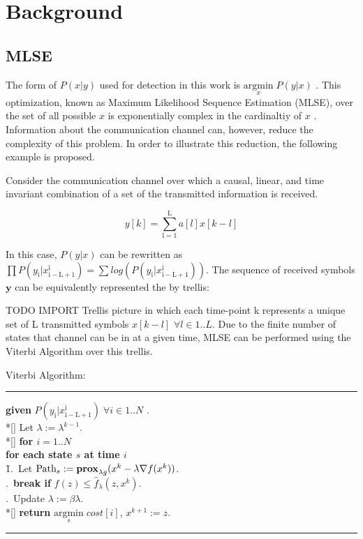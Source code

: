 \documentclass[12pt,a4paper]{report}
\begin{document}
\section{Background}

\subsection{MLSE}
The form of $P(x|y)$ used for detection in this work is
$\underset{x}{\text{argmin}} \; P(y|x) $ . This optimization, known as Maximum Likelihood Sequence Estimation (MLSE), over the set of all possible $x$ is exponentially complex in the cardinaltiy of $x$ . Information about the communication channel can, however, reduce the complexity of this problem. In order to illustrate this reduction, the following example is proposed.
\par
Consider the communication channel over which a causal, linear, and time invariant combination of a set of the transmitted information is received. 

\begin{equation}
y[k] = \sum_{\mathrm{l=1}}^{\mathrm{L}} a[l]x[k-l]
\end{equation}

In this case, $P(y|x)$ can be rewritten as
$\prod P(y_{\mathrm{i}}|x_{\mathrm{i-L+1}}^{\mathrm{i}}) = \sum
log(P(y_{\mathrm{i}}|x_{\mathrm{i-L+1}}^{\mathrm{i}}) )$.
The sequence of received symbols $\mathbf{y}$ can be equivalently represented the by trellis:

TODO IMPORT Trellis picture
in which each time-point k represents a unique set of L transmitted symbols 
$x[k-l]$ $ \forall l \in {1..L}$. Due to the finite number of states that channel can be in at a given time, MLSE can be performed using the Viterbi Algorithm over this trellis. 

Viterbi Algorithm:

    \noindent\rule[10pt]{\textwidth}{0.4pt}
    {\footnotesize
    \begin{tabbing}
        {\bf given} $P(y_{\mathrm{i}}|x_{\mathrm{i-L+1}}^{\mathrm{i}}) \; \forall i \in {1..N}$ . \\*[\smallskipamount]
        Let $\lambda := \lambda^{k-1}$. \\*[\smallskipamount]
        {\bf for $i = 1..N $} \\
         \qquad \= {\bf for each state $s$ at time $i$}\\
        \qquad \qquad \= 1.\ Let $\mathrm{Path}_{s} := \mathbf{prox}_{\lambda g}(x^{k} - \lambda \nabla f(x^{k}))$. \\
        .\ {\bf break if} $f(z) \leq \hat{f}_{\lambda}(z, x^{k})$. \\
        .\ Update $\lambda := \beta \lambda$. \\*[\smallskipamount]
        {\bf return} $\underset{s}{\text{argmin}} \; cost[i] $, $x^{k+1}:=z$.
    \end{tabbing}}
    \noindent\rule[10pt]{\textwidth}{0.4pt}
\end{document}
